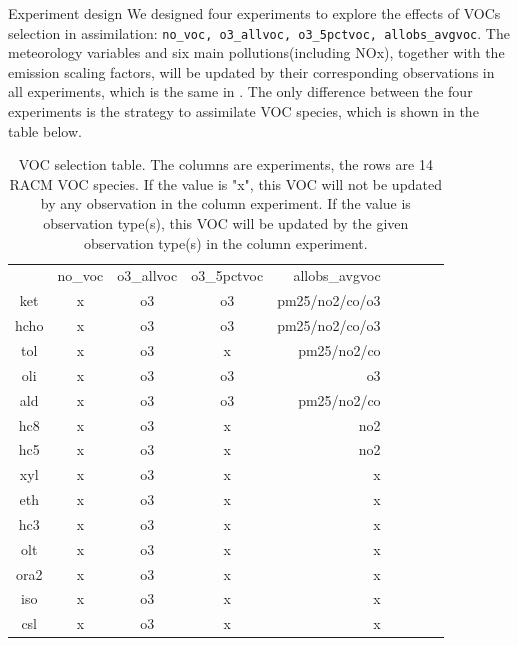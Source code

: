 \documentclass[final]{beamer}
\newlength{\colwidth}
\begin{document}
\begin{frame}[t]
\begin{columns}[t]
\begin{column}{\colwidth}
			\begin{block}{Experiment design}
               We designed four experiments to explore the effects of VOCs selection in assimilation: \texttt{no\_voc, o3\_allvoc, o3\_5pctvoc, allobs\_avgvoc}. The meteorology variables and six main pollutions(including NOx), together with the emission scaling factors, will be updated by their corresponding observations in all experiments, which is the same in \parencite{Peng_2020}. The only difference between the four experiments is the strategy to assimilate VOC species, which is shown in the table below.
                \begin{table}[t]
                    \begin{center}
                    \begin{tabular}{ccccrrcrc}
                    \hline\hline
                     & no\_voc & o3\_allvoc & o3\_5pctvoc & allobs\_avgvoc \\
                    ket & x & o3 & o3 & pm25/no2/co/o3 \\ 
                    hcho & x & o3 & o3 & pm25/no2/co/o3 \\ 
                    tol & x & o3 & x & pm25/no2/co \\ 
                    oli & x & o3 & o3 & o3 \\ 
                    ald & x & o3 & o3 & pm25/no2/co \\ 
                    hc8 & x & o3 & x & no2 \\ 
                    hc5 & x & o3 & x & no2 \\ 
                    xyl & x & o3 & x & x \\ 
                    eth & x & o3 & x & x \\ 
                    hc3 & x & o3 & x & x \\ 
                    olt & x & o3 & x & x \\ 
                    ora2 & x & o3 & x & x \\ 
                    iso & x & o3 & x & x \\ 
                    csl & x & o3 & x & x \\ 
                    \hline
                    
                    
                    \hline
                    \end{tabular}
                    
                    \end{center}
                    \caption{VOC selection table. The columns are experiments, the rows are 14 RACM VOC species. If the value is "x", this VOC will not be updated by any observation in the column experiment. If the value is observation type(s), this VOC will be updated by the given observation type(s) in the column experiment. }\label{tab_voc}
                    

\end{table}
\end{block}
\end{column}
\end{columns}
\end{frame}
\end{document}
